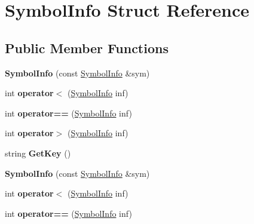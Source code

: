 \hypertarget{structSymbolInfo}{\section{Symbol\-Info Struct Reference}
\label{structSymbolInfo}
}
\subsection*{Public Member Functions}
\begin{DoxyCompactItemize}
\item 
\hypertarget{structSymbolInfo_acb7b0eeb9676abd3b3e811eeb4a493d3}{{\bfseries Symbol\-Info} (const \hyperlink{structSymbolInfo}{Symbol\-Info} \&sym)}\label{structSymbolInfo_acb7b0eeb9676abd3b3e811eeb4a493d3}

\item 
\hypertarget{structSymbolInfo_a3d6aa82818a3ed3f8f0dc21ae16cc032}{int {\bfseries operator$<$} (\hyperlink{structSymbolInfo}{Symbol\-Info} inf)}\label{structSymbolInfo_a3d6aa82818a3ed3f8f0dc21ae16cc032}

\item 
\hypertarget{structSymbolInfo_ad695eec927b408d238f50f06c6ecde78}{int {\bfseries operator==} (\hyperlink{structSymbolInfo}{Symbol\-Info} inf)}\label{structSymbolInfo_ad695eec927b408d238f50f06c6ecde78}

\item 
\hypertarget{structSymbolInfo_a65d5949e426bf0b74c6cbada3b298ae0}{int {\bfseries operator$>$} (\hyperlink{structSymbolInfo}{Symbol\-Info} inf)}\label{structSymbolInfo_a65d5949e426bf0b74c6cbada3b298ae0}

\item 
\hypertarget{structSymbolInfo_ac3b23c499dde616bed334c147b46c6c8}{string {\bfseries Get\-Key} ()}\label{structSymbolInfo_ac3b23c499dde616bed334c147b46c6c8}

\item 
\hypertarget{structSymbolInfo_acb7b0eeb9676abd3b3e811eeb4a493d3}{{\bfseries Symbol\-Info} (const \hyperlink{structSymbolInfo}{Symbol\-Info} \&sym)}\label{structSymbolInfo_acb7b0eeb9676abd3b3e811eeb4a493d3}

\item 
\hypertarget{structSymbolInfo_a3d6aa82818a3ed3f8f0dc21ae16cc032}{int {\bfseries operator$<$} (\hyperlink{structSymbolInfo}{Symbol\-Info} inf)}\label{structSymbolInfo_a3d6aa82818a3ed3f8f0dc21ae16cc032}

\item 
\hypertarget{structSymbolInfo_ad695eec927b408d238f50f06c6ecde78}{int {\bfseries operator==} (\hyperlink{structSymbolInfo}{Symbol\-Info} inf)}\label{structSymbolInfo_ad695eec927b408d238f50f06c6ecde78}


\end{DoxyCompactItemize}
